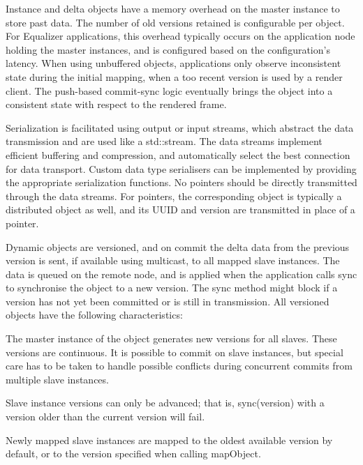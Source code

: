 Instance and delta objects have a memory overhead on the master instance to
store past data. The number of old versions retained is configurable per
object. For Equalizer applications, this overhead typically occurs on the
application node holding the master instances, and is configured based on the
configuration's latency. When using unbuffered objects, applications only
observe inconsistent state during the initial mapping, when a too recent
version is used by a render client. The push-based commit-sync logic eventually
brings the object into a consistent state with respect to the rendered frame.

Serialization is facilitated using output or input streams, which abstract the
data transmission and are used like a \textsf{std::stream}. The data streams
implement efficient buffering and compression, and automatically select the best
connection for data transport. Custom data type serialisers can be implemented
by providing the appropriate serialization functions. No pointers should be
directly transmitted through the data streams. For pointers, the corresponding
object is typically a distributed object as well, and its UUID and version are
transmitted in place of a pointer.

Dynamic objects are versioned, and on \textsf{commit} the delta data from the
previous version is sent, if available using multicast, to all mapped slave
instances. The data is queued on the remote node, and is applied when the
application calls \textsf{sync} to synchronise the object to a new version. The
\textsf{sync} method might block if a version has not yet been committed or is
still in transmission. All versioned objects have the following characteristics:

\begin{compactitem}

\item The master instance of the object generates new versions for all slaves.
These versions are continuous. It is possible to commit on slave instances, but
special care has to be taken to handle possible conflicts during concurrent
commits from multiple slave instances.

\item Slave instance versions can only be advanced; that is,
\textsf{sync(version)} with a version older than the current version will fail.

\item Newly mapped slave instances are mapped to the oldest available version
by default, or to the version specified when calling \textsf{mapObject}.

\end{compactitem}

